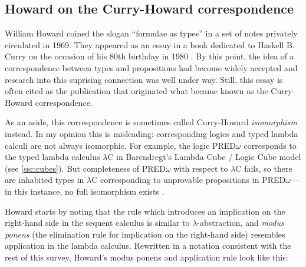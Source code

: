 \documentclass[12pt,toc=bibliography,numbers=noendperiod,
               footnotes=multiple,twoside]{scrartcl}
\begin{document}
\subsection{Howard on the Curry-Howard correspondence}

William Howard coined the slogan \enquote{formulae as types} in a set of notes privately circulated in 1969. They appeared as an essay in a book dedicated to Haskell B. Curry on the occasion of his 80th birthday in 1980 \autocite{howard_formulae-as-types_1980}. By this point, the idea of a correspondence between types and propositions had become widely accepted and research into this suprising connection was well under way. Still, this essay is often cited as the publication that originated what became known as the Curry-Howard correspondence.

As an aside, this correspondence is sometimes called Curry-Howard \emph{isomorphism} instead. In my opinion this is misleading: corresponding logics and typed lambda calculi are not always isomorphic. For example, the logic PRED\(\omega\) corresponds to the typed lambda calculus \(\lambda\)C in Barendregt's Lambda Cube / Logic Cube model (see \cref{ssc:cubes}). But completeness of PRED\(\omega\) with respect to \(\lambda\)C fails, so there are inhabited types in \(\lambda\)C corresponding to unprovable propositions in PRED\(\omega\)---in this instance, no full isomorphism exists \autocite[250]{barendregt_lambda_1992}.

Howard starts by noting that the rule which introduces an implication on the right-hand side in the sequent calculus is similar to \(\lambda\)-abstraction, and \emph{modus ponens} (the elimination rule for implication on the right-hand side) resembles application in the lambda calculus. Rewritten in a notation consistent with the rest of this survey, Howard's modus ponens and application rule look like this:

\begin{figure}[h]
\begin{minipage}[b]{1\linewidth}
\centering
\begin{minipage}[b]{0.4\linewidth}
\begin{prooftree}
\end{prooftree}
\end{minipage}
\begin{minipage}[b]{0.4\linewidth}
\begin{prooftree}
\end{prooftree}
\end{minipage}
\end{minipage}
\end{figure}
\end{document}
